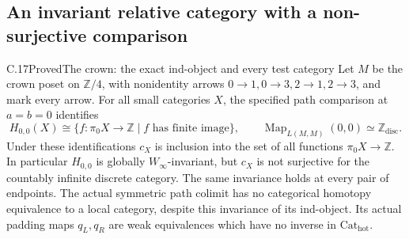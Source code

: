 \subsection{An invariant relative category with a non-surjective comparison}

\begin{claim}{C.17}{Proved}{The crown: the exact ind-object and every test category}
Let $M$ be the crown poset on $\mathbb Z/4$, with nonidentity
arrows $0\to1,0\to3,2\to1,2\to3$, and mark every arrow.
For all small categories $X$, the specified path comparison at
$a=b=0$ identifies
\[
 H_{0,0}(X)\cong
 \{f:\pi_0X\to\mathbb Z\mid f\text{ has finite image}\},
 \qquad
 \operatorname{Map}_{L(M,M)}(0,0)\simeq\mathbb Z_{\mathrm{disc}}.
                                                               \tag{C.17.1}
\]
Under these identifications $c_X$ is inclusion into the set of
all functions $\pi_0X\to\mathbb Z$. In particular $H_{0,0}$
is globally $W_\infty$-invariant, but $c_X$ is not surjective
for the countably infinite discrete category. The same invariance
holds at every pair of endpoints. The actual symmetric path
colimit has no categorical homotopy equivalence to a local
category, despite this invariance of its ind-object. Its actual
padding maps $q_L,q_R$ are weak equivalences which have no
inverse in $\mathrm{Cat}_{\mathrm{hot}}$.
\end{claim}
